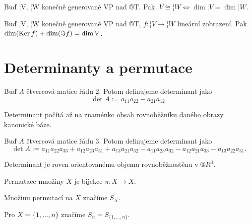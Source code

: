\documentclass[12pt]{article}					%
\begin{document}
    \begin{veta}
        Buď ¦V, ¦W konečně generované VP nad ®T. Pak $¦V \cong ¦W \Leftrightarrow \dim ¦V = \dim ¦W$.
    \end{veta}

    \begin{veta}
        Buď ¦V, ¦W konečně generované VP nad ®T, $f: ¦V \rightarrow ¦W$ lineární zobrazení. Pak $\dim(\operatorname{Ker} f) + \dim(\Im f) = \dim V$.
    \end{veta}


\section{Determinanty a permutace}
    \begin{definice}
        Buď $A$ čtvercová matice řádu 2. Potom definujeme determinant jako
        $$ \det A := a_{11}a_{22} - a_{21}a_{12}. $$ 
    \end{definice}

    \begin{poznamka}
        Determinant počítá až na znaménko obsah rovnoběžníku daného obrazy kanonické báze.
    \end{poznamka}

    \begin{definice}
        Buď $A$ čtvercová matice řádu 3. Potom definujeme determinant jako
        $$ \det A := a_{11}a_{22}a_{33} + a_{12}a_{23}a_{31} + a_{13}a_{21}a_{32} - a_{11}a_{23}a_{32} - a_{12}a_{21}a_{33} - a_{13}a_{22}a_{31}. $$ 
    \end{definice}

    \begin{poznamka}
        Determinant je roven orientovanému objemu rovnoběžnostěnu v $®R^3$.
    \end{poznamka}

    \begin{definice}
        Permutace množiny $X$ je bijekce $\pi: X \rightarrow X$.

        Množinu permutací na $X$ značíme $S_X$.

        Pro $X=\{1, …, n\}$ značíme $S_n = S_{\{1, …, n\}}$.
    \end{definice}
\end{document}
